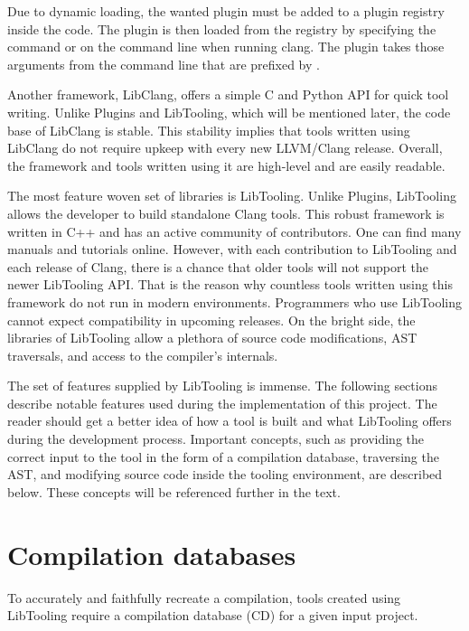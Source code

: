 Due to dynamic loading, the wanted plugin must be added to a plugin registry 
inside the code.
The plugin is then loaded from the registry by specifying the  
command or  on the command line when running clang.
The plugin takes those arguments from the command line that are prefixed 
by .

Another framework, LibClang, offers a simple C and Python API for quick 
tool writing. 
Unlike Plugins and LibTooling, which will be mentioned later, the code 
base of LibClang is stable. 
This stability implies that tools written using LibClang do not require
upkeep with every new LLVM/Clang release. 
Overall, the framework and tools written using it are high-level and 
are easily readable.

The most feature woven set of libraries is LibTooling. 
Unlike Plugins, LibTooling \citep{libtooling:online} 
allows the developer to build standalone 
Clang tools. 
This robust framework is written in C++ and has an active 
community of contributors. 
One can find many manuals and tutorials online. 
However, with each contribution to LibTooling and each release of Clang, 
there is a chance that older tools will not support the newer LibTooling 
API. 
That is the reason why countless tools written using this framework do not
run in modern environments. 
Programmers who use LibTooling cannot expect compatibility in upcoming 
releases. 
On the bright side, the libraries of LibTooling allow a plethora of source
code modifications, AST traversals, and access to the compiler's internals.

The set of features supplied by LibTooling is immense. 
The following sections describe notable features used during 
the implementation of this project. 
The reader should get a better idea of how a tool is built and what 
LibTooling offers during the development process. 
Important concepts, such as providing the correct input to the tool 
in the form of a compilation database, traversing the AST, 
and modifying source code inside the tooling environment, 
are described below. 
These concepts will be referenced further in the text.

\section{Compilation databases}

To accurately and faithfully recreate a compilation, tools created using 
LibTooling require a compilation database (CD) \citep{cd:online} 
for a given input project.

